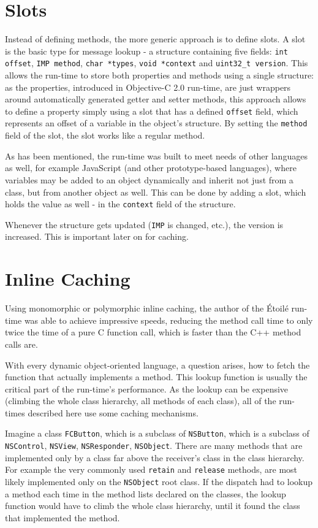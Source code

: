 \section{Slots}
Instead of defining methods, the more generic approach is to define slots. A slot is the basic type for message lookup - a structure containing five fields: \verb=int offset=, \verb=IMP method=, \verb=char *types=, \verb=void *context= and \verb=uint32_t version=. This allows the run-time to store both properties and methods using a single structure: as the properties, introduced in Objective-C 2.0 run-time, are just wrappers around automatically generated getter and setter methods, this approach allows to define a property simply using a slot that has a defined \verb=offset= field, which represents an offset of a variable in the object's structure. By setting the \verb=method= field of the slot, the slot works like a regular method.

As has been mentioned, the run-time was built to meet needs of other languages as well, for example JavaScript (and other prototype-based languages), where variables may be added to an object dynamically and inherit not just from a class, but from another object as well. This can be done by adding a slot, which holds the value as well - in the \verb=context= field of the structure.

Whenever the structure gets updated (\verb=IMP= is changed, etc.), the version is increased. This is important later on for caching.


\section{Inline Caching}
Using monomorphic or polymorphic inline caching, the author of the \'Etoil\'e run-time was able to achieve impressive speeds, reducing the method call time to only twice the time of a pure C function call, which is faster than the C++ method calls are.

With every dynamic object-oriented language, a question arises, how to fetch the function that actually implements a method. This lookup function is usually the critical part of the run-time's performance. As the lookup can be expensive (climbing the whole class hierarchy, all methods of each class), all of the run-times described here use some caching mechanisms.

Imagine a class \verb=FCButton=, which is a subclass of \verb=NSButton=, which is a subclass of \verb=NSControl=, \verb=NSView=, \verb=NSResponder=, \verb=NSObject=. There are many methods that are implemented only by a class far above the receiver's class in the class hierarchy. For example the very commonly used \verb=retain= and \verb=release= methods, are most likely implemented only on the \verb=NSObject= root class. If the dispatch had to lookup a method each time in the method lists declared on the classes, the lookup function would have to climb the whole class hierarchy, until it found the class that implemented the method.

